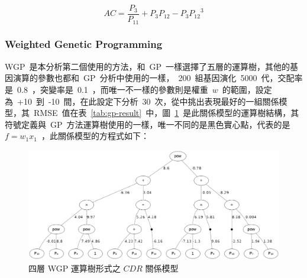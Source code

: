 \begin{equation} AC = \dfrac{P_3}{P_{11}} + P_3 P_{12} - P_3 {P_{12}}^3  \label{eq:GP_AC}\end{equation}

\subsubsection{Weighted Genetic Programming}

WGP~是本分析第二個使用的方法，和~GP~一樣選擇了五層的運算樹，其他的基因演算的參數也都和~GP~分析中使用的一樣，~200~組基因演化~5000~代，交配率是~0.8~，突變率是~0.1~，而唯一不一樣的參數則是權重~$w$~的範圍，設定為~+10~到~-10~間，在此設定下分析~30~次，從中挑出表現最好的一組關係模型，其~RMSE~值在表~\ref{tab:gp-result}~中，圖~\ref{fig:4LWGP}~是此關係模型的運算樹結構，其符號定義與~GP~方法運算樹使用的一樣，唯一不同的是黑色實心點，代表的是~$f = w_1x_1$~，此關係模型的方程式如下：

\begin{figure}[hbtp]
  \begin{center}
    \includegraphics[width=1.0\textwidth]{figures/4-layer-wgp.png}
    \caption{四層 WGP 運算樹形式之 $CDR$ 關係模型} 
    \label{fig:4LWGP}
  \end{center}
\end{figure}



